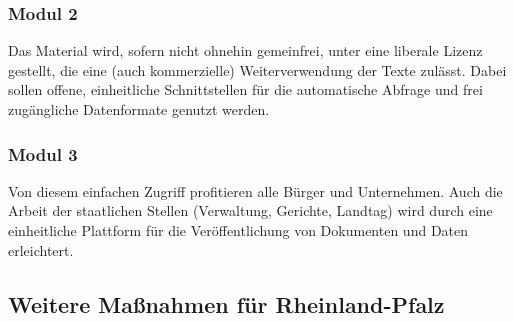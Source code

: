 \subsubsection{Modul 2}
\abstimmung
Das Material wird, sofern nicht ohnehin gemeinfrei, unter eine liberale Lizenz gestellt, die eine (auch kommerzielle) Weiterverwendung der Texte zulässt. Dabei sollen offene, einheitliche Schnittstellen für die automatische Abfrage und frei zugängliche Datenformate genutzt werden.

\subsubsection{Modul 3}
\abstimmung
Von diesem einfachen Zugriff profitieren alle Bürger und Unternehmen. Auch die Arbeit der staatlichen Stellen (Verwaltung, Gerichte, Landtag) wird durch eine einheitliche Plattform für die Veröffentlichung von Dokumenten und Daten erleichtert.
 
\subsection*{Weitere Maßnahmen für Rheinland-Pfalz}
\label{transparenz:weiter}
